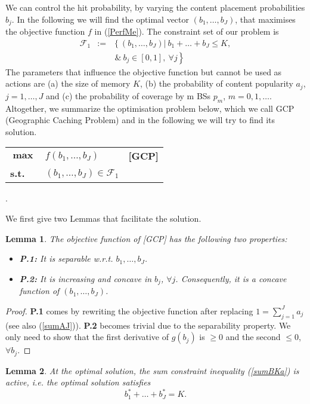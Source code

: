 \documentclass[conference,twocolum,final]{IEEEtran}
\newtheorem{Lem}{Lemma}
\begin{document}
We can control the hit probability, by varying the content placement probabilities $b_j$. In the following we will find the optimal vector $\left(b_1,\ldots,b_J\right)$, that maximises the objective function $f$ in (\ref{PerfMe}). The constraint set of our problem is 
\begin{eqnarray}
\label{CS1}
\mathcal{F}_1 & := & \left\{ (b_1,\ldots,b_J)|\ b_1+\ldots+b_J\leq K,\right.\nonumber\\
& & \left. \ \& \ b_j\in\left[0,1\right], \ \forall j\right\}
\end{eqnarray}
The parameters that influence the objective function but cannot be used as actions are (a) the size of memory $K$, (b) the probability of content popularity $a_j$, $j=1,\ldots,J$ and (c) the probability of coverage by m BSs $p_m$, $m=0,1,\ldots$. 
Altogether, we summarize the optimisation problem below, which we call GCP (Geographic Caching Problem) and in the following we will try to find its solution. 
\begin{center}
\begin{tabular}{l l c}
$\mathbf{\max}$ 	& 	$f\left(b_1,\ldots, b_J\right)$	& \textbf{[GCP]}\\
\textbf{s.t.}		&	$\left(b_1,\ldots,b_J\right)\in\mathcal{F}_1$		&
\end{tabular}.
\end{center}
We first give two Lemmas that facilitate the solution.
\begin{Lem}
\label{Lem1}
The objective function of [GCP] has the following two properties:
\begin{itemize}
\item \textbf{P.1:} It is separable w.r.t. $b_1,\ldots,b_J$.\item \textbf{P.2:} It is increasing and concave in $b_j$, $\forall j$. Consequently, it is a concave function of $\left(b_1,\ldots,b_J\right)$.
\end{itemize}
\end{Lem}
\begin{proof}
\textbf{P.1} comes by rewriting the objective function after replacing $1=\sum_{j=1}^Ja_j$ (see also (\ref{sumAJ})). \textbf{P.2} becomes trivial due to the separability property. We only need to show that the first derivative of $g(b_j)$ is $\geq 0$ and the second $\leq 0$, $\forall b_j$.
\end{proof}
\begin{Lem}
\label{Lem2}
At the optimal solution, the sum constraint inequality (\ref{sumBKa}) is active, i.e. the optimal solution satisfies 
\begin{equation}
\label{EqConst}
b_1^*+\ldots+b_J^*  =  K.
\end{equation}
\end{Lem}
\end{document}
